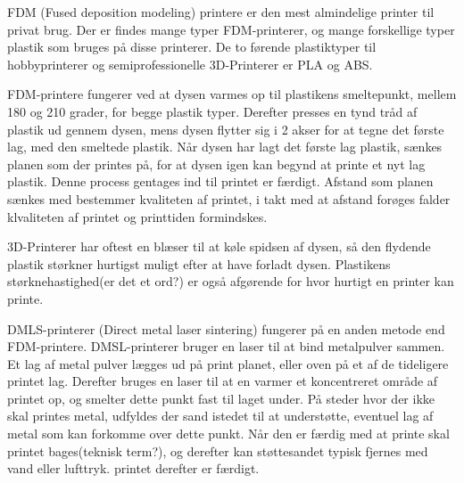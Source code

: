 FDM (Fused deposition modeling) printere er den mest almindelige printer til privat brug. Der er findes mange typer FDM-printerer, og mange forskellige typer plastik som bruges på disse printerer. De to førende plastiktyper til hobbyprinterer og semiprofessionelle 3D-Printerer er PLA og ABS. 


FDM-printere fungerer ved at dysen varmes op til plastikens smeltepunkt, mellem 180 og 210 grader, for begge plastik typer. Derefter presses en tynd tråd af plastik ud gennem dysen, mens dysen flytter sig i 2 akser for at tegne det første lag, med den smeltede plastik. 
Når dysen har lagt det første lag plastik, sænkes planen som der printes på, for at dysen igen kan begynd at printe et nyt lag plastik. Denne process gentages ind til printet er færdigt. 
Afstand som planen sænkes med bestemmer kvaliteten af printet, i takt med at afstand forøges falder klvaliteten af printet og printtiden formindskes.

3D-Printerer har oftest en blæser til at køle spidsen af dysen, så den flydende plastik størkner hurtigst muligt efter at have forladt dysen. Plastikens størknehastighed(er det et ord?) er også afgørende for hvor hurtigt en printer kan printe. 

DMLS-printerer (Direct metal laser sintering) fungerer på en anden metode end FDM-printere. DMSL-printerer bruger en laser til at bind metalpulver sammen. Et lag af metal pulver lægges ud på print planet, eller oven på et af de tideligere printet lag. Derefter bruges en laser til at en varmer et koncentreret område af printet op, og smelter dette punkt fast til laget under. På steder hvor der ikke skal printes metal, udfyldes der sand istedet til at understøtte, eventuel lag af metal som kan forkomme over dette punkt.
Når den er færdig med at printe skal printet bages(teknisk term?), og derefter kan støttesandet typisk fjernes med vand eller lufttryk. printet derefter er færdigt.



